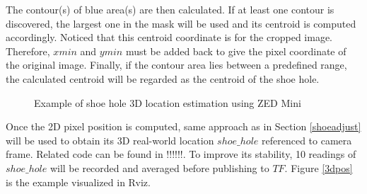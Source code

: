 The contour(s) of blue area(s) are then calculated. If at least one contour is discovered, the largest one in the mask will be used and its centroid is computed accordingly. Noticed that this centroid coordinate is for the cropped image. Therefore, $xmin$ and $ymin$ must be added back to give the pixel coordinate of the original image. Finally, if the contour area lies between a predefined range, the calculated centroid will be regarded as the centroid of the shoe hole.

\begin{figure}[H]
\centering
{}
\caption{Example of shoe hole 3D location estimation using ZED Mini}
\end{figure}

Once the 2D pixel position is computed, same approach as in Section \ref{shoeadjust} will be used to obtain its 3D real-world location $shoe\_hole$ referenced to camera frame. Related code can be found in !!!!!!. To improve its stability, 10 readings of $shoe\_hole$ will be recorded and averaged before publishing to $TF$. Figure \ref{3dpos} is the example visualized in Rviz.

